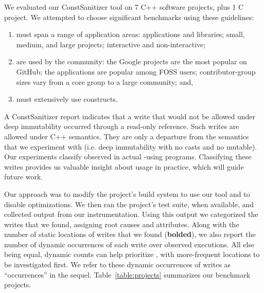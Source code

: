 We evaluated our ConstSanitizer tool on 7 C++ software projects, plus 1 C project.
We attempted to choose significant benchmarks using these
guidelines:

\begin{enumerate}
  \item must span a range of application areas: applications and libraries; small,
        medium, and large projects; interactive and non-interactive;
  \item are used by the community: the Google projects are the most popular on
        GitHub; the applications are popular among FOSS users; contributor-group
        sizes vary from a core group to a large community; and,
  \item must extensively use \const{} constructs.
\end{enumerate}

\noindent
A ConstSanitizer report indicates that a write that would not be allowed under
deep immutability occurred through a read-only reference.
Such writes are allowed under C++ semantics.
They are only a departure from the \const{} semantics that we experiment
with (i.e. deep immutability with no casts and no mutable).
Our experiments classify \wstc{} observed in actual \const{}-using programs.
Classifying these writes provides us valuable insight about \const{} usage in
practice, which will guide future work.

Our approach was to modify the project's build system to use our tool and to
disable optimizations.
We then ran the project's test suite, when available, and collected output from
our instrumentation.
Using this output we categorized the writes that we found, assigning root causes
and attributes.
Along with the number of static locations of writes that we found
(\textbf{bolded}), we also report the number of dynamic occurrences of each
write over observed executions.
All else being equal, dynamic counts can help prioritize \wstc{}, with
more-frequent locations to be investigated first.
We refer to these dynamic occurrences of writes as ``occurrences'' in the
sequel.
Table~\ref{table:projects} summarizes our benchmark projects.

